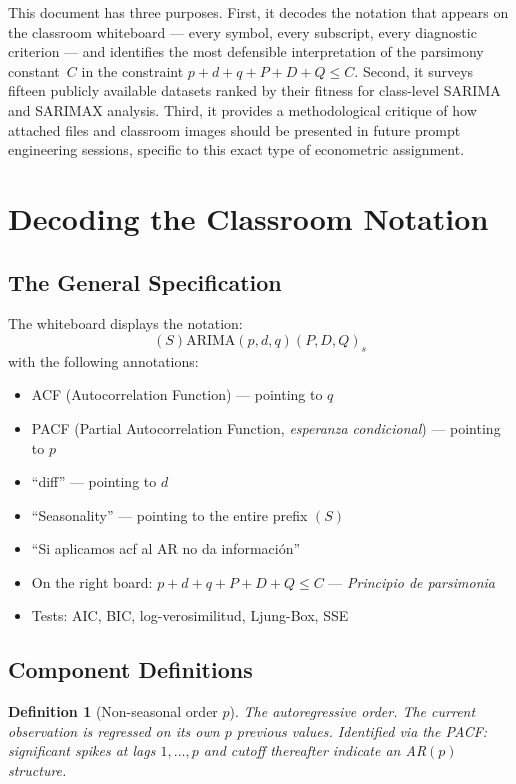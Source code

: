 \documentclass[12pt,a4paper]{article}
\newtheorem{definition}{Definition}[section]
\begin{document}
This document has three purposes. First, it decodes the notation that appears on
the classroom whiteboard — every symbol, every subscript, every diagnostic
criterion — and identifies the most defensible interpretation of the parsimony
constant~$C$ in the constraint $p+d+q+P+D+Q\le C$. Second, it surveys fifteen
publicly available datasets ranked by their fitness for class-level SARIMA and
SARIMAX analysis. Third, it provides a methodological critique of how attached
files and classroom images should be presented in future prompt engineering
sessions, specific to this exact type of econometric assignment.

\section{Decoding the Classroom Notation}

\subsection{The General Specification}

The whiteboard displays the notation:
\[
    (S)\text{ARIMA}(p,d,q)(P,D,Q)_s
\]
with the following annotations:
\begin{itemize}[noitemsep]
  \item ACF (Autocorrelation Function) — pointing to $q$
  \item PACF (Partial Autocorrelation Function, \textit{esperanza condicional}) — pointing to $p$
  \item ``diff'' — pointing to $d$
  \item ``Seasonality'' — pointing to the entire prefix $(S)$
  \item ``Si aplicamos acf al AR no da información''
  \item On the right board: $p+d+q+P+D+Q\le C$ — \textit{Principio de parsimonia}
  \item Tests: AIC, BIC, log-verosimilitud, Ljung-Box, SSE
\end{itemize}

\subsection{Component Definitions}

\begin{definition}[Non-seasonal order $p$]
The autoregressive order. The current observation is regressed on its own $p$
previous values. Identified via the PACF: significant spikes at lags $1,\dots,p$
and cutoff thereafter indicate an AR$(p)$ structure.
\end{definition}
\end{document}
